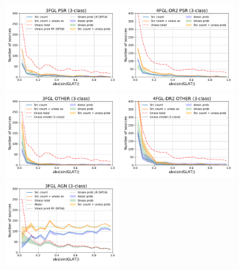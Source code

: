 \begin{figure}[h]
\center
\includegraphics[width=0.45\textwidth]{plots/lat_profile_PSR_3FGL_3classes.pdf}
\includegraphics[width=0.45\textwidth]{plots/lat_profile_PSR_4FGL-DR2_3classes.pdf} \\
\includegraphics[width=0.45\textwidth]{plots/lat_profile_OTHER_3FGL_3classes.pdf}
\includegraphics[width=0.45\textwidth]{plots/lat_profile_OTHER_4FGL-DR2_3classes.pdf} \\ 
\includegraphics[width=0.45\textwidth]{plots/lat_profile_AGN_3FGL_3classes.pdf}

\end{figure}
